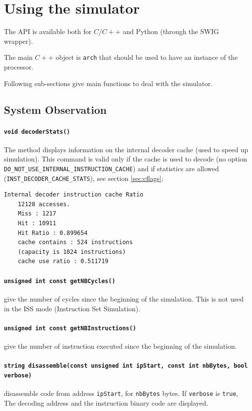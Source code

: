\section{Using the simulator}
The API is available both for $C$/$C++$ and Python (through the SWIG wrapper).

The main $C++$ object is \texttt{arch} that should be used to have an instance of the processor.

Following sub-sections give main functions to deal with the simulator.
\subsection{System Observation}

\paragraph{\texttt{void decoderStats()}}
The method displays information on the internal decoder cache (used to speed up simulation). This command is valid only if the cache is used to decode (no option \texttt{DO\_NOT\_USE\_INTERNAL\_INSTRUCTION\_CACHE}) and if statistics are allowed (\texttt{INST\_DECODER\_CACHE\_STATS}), see section \ref{sec:cflags}:
\begin{verbatim}
Internal decoder instruction cache Ratio
    12128 accesses.
    Miss : 1217
    Hit : 10911
    Hit Ratio : 0.899654
    cache contains : 524 instructions
    (capacity is 1024 instructions)
    cache use ratio : 0.511719
\end{verbatim}

\paragraph{\texttt{unsigned int const getNBCycles()}} give the number of cycles since the beginning of the simulation. This is not used in the ISS mode (Instruction Set Simulation).
\paragraph{\texttt{unsigned int const getNBInstructions()}} give the number of instruction executed since the beginning of the simulation.
\paragraph{\texttt{string disassemble(const unsigned int ipStart, const int nbBytes, bool verbose)}} disassemble code from address
\texttt{ipStart}, for \texttt{nbBytes} bytes. If \texttt{verbose} is \texttt{true}, The decoding address and the instruction binary code are displayed.

